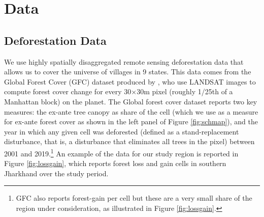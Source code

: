 \documentclass[12pt,reqno]{article}
\begin{document}







\section{Data} %
\label{sec:data}

\subsection{Deforestation Data} %
\label{sub:deforestation_data}


We use highly spatially disaggregated remote sensing deforestation data that allows us to cover the universe of villages in 9 states. This data comes from the Global Forest Cover (GFC) dataset produced by \textcite{Hansen2013-vk}, who use LANDSAT images to compute forest cover change for every 30$\times$30m pixel (roughly 1/25th of a Manhattan block) on the planet. The Global forest cover dataset reports two key measures: the ex-ante tree canopy as share of the cell (which we use as a measure for ex-ante forest cover as shown in the left panel of Figure \ref{fig:schmap}), and the year in which any given cell was deforested (defined as a stand-replacement disturbance, that is, a disturbance that eliminates all trees in the pixel) between 2001 and 2019.\footnote{GFC also reports forest-gain per cell but these are a very small share of the region under consideration, as illustrated in Figure \ref{fig:lossgain}.} An example of the data for our study region is reported in Figure \ref{fig:lossgain}, which reports forest loss and gain cells in southern Jharkhand over the study period. 
\end{document}
